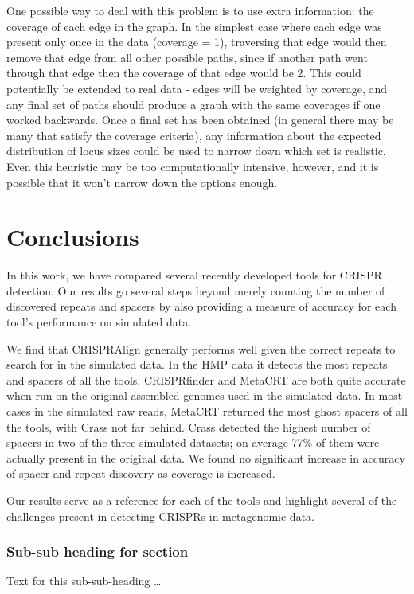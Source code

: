 \documentclass{bmcart}
\begin{document}
One possible way to deal with this problem is to use extra information: the coverage of each edge in the graph. In the simplest case where each edge was present only once in the data (coverage = 1), traversing that edge would then remove that edge from all other possible paths, since if another path went through that edge then the coverage of that edge would be 2. This could potentially be extended to real data - edges will be weighted by coverage, and any final set of paths should produce a graph with the same coverages if one worked backwards. Once a final set has been obtained (in general there may be many that satisfy the coverage criteria), any information about the expected distribution of locus sizes could be used to narrow down which set is realistic. Even this heuristic may be too computationally intensive, however, and it is possible that it won’t narrow down the options enough. 

\section*{Conclusions}

In this work, we have compared several recently developed tools for CRISPR detection. Our results go several steps beyond merely counting the number of discovered repeats and spacers by also providing a measure of accuracy for each tool’s performance on simulated data. 


We find that CRISPRAlign generally performs well given the correct repeats to search for in the simulated data. In the HMP data it detects the most repeats and spacers of all the tools. CRISPRfinder and MetaCRT are both quite accurate when run on the original assembled genomes used in the simulated data. In most cases in the simulated raw reads, MetaCRT returned the most ghost spacers of all the tools, with Crass not far behind. Crass detected the highest number of spacers in two of the three simulated datasets; on average 77\% of them were actually present in the original data. We found no significant increase in accuracy of spacer  and repeat discovery as coverage is increased. 

Our results serve as a reference for each of the tools and highlight several of the challenges present in detecting CRISPRs in metagenomic data. 



\subsubsection*{Sub-sub heading for section}
Text for this sub-sub-heading \ldots
\end{document}
